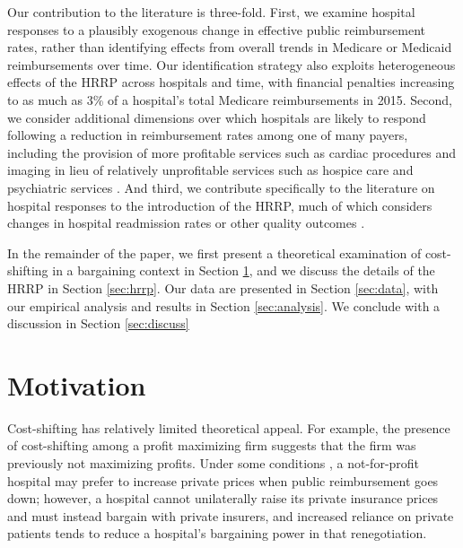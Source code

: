 \documentclass[12pt]{article}
\begin{document}
Our contribution to the literature is three-fold. First, we examine hospital responses to a plausibly exogenous change in effective public reimbursement rates, rather than identifying effects from overall trends in Medicare or Medicaid reimbursements over time. Our identification strategy also exploits heterogeneous effects of the HRRP across hospitals and time, with financial penalties increasing to as much as 3\% of a hospital's total Medicare reimbursements in 2015. Second, we consider additional dimensions over which hospitals are likely to respond following a reduction in reimbursement rates among one of many payers, including the provision of more profitable services such as cardiac procedures and imaging in lieu of relatively unprofitable services such as hospice care and psychiatric services \citep{horwitz2009}. And third, we contribute specifically to the literature on hospital responses to the introduction of the HRRP, much of which considers changes in hospital readmission rates or other quality outcomes \citep{carey2015,mellor2016}.

In the remainder of the paper, we first present a theoretical examination of cost-shifting in a bargaining context in Section \ref{sec:motivation}, and we discuss the details of the HRRP in Section \ref{sec:hrrp}. Our data are presented in Section \ref{sec:data}, with our empirical analysis and results in Section \ref{sec:analysis}. We conclude with a discussion in Section \ref{sec:discuss}

\section{Motivation}
\label{sec:motivation}
Cost-shifting has relatively limited theoretical appeal. For example, the presence of cost-shifting among a profit maximizing firm suggests that the firm was previously not maximizing profits. Under some conditions \citep{dranove1988}, a not-for-profit hospital may prefer to increase private prices when public reimbursement goes down; however, a hospital cannot unilaterally raise its private insurance prices and must instead bargain with private insurers, and increased reliance on private patients tends to reduce a hospital's bargaining power in that renegotiation.
\end{document}
